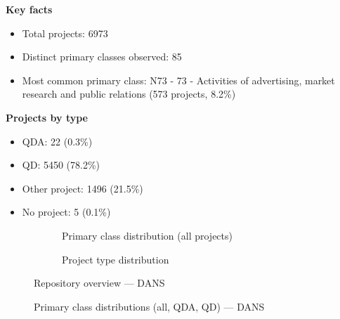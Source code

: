 \textbf{Key facts}

\begin{itemize}
    \item Total projects: 6973
    \item Distinct primary classes observed: 85
    \item Most common primary class: N73 - 73 - Activities of advertising, market research and public relations (573 projects, 8.2\%)
\end{itemize}

\textbf{Projects by type}

\begin{itemize}
    \item QDA: 22 (0.3\%)
    \item QD: 5450 (78.2\%)
    \item Other project: 1496 (21.5\%)
    \item No project: 5 (0.1\%)
\end{itemize}

\begin{figure}[H]
    \centering
    \begin{subfigure}[t]{0.49\textwidth}
        \centering
        
        \caption{Primary class distribution (all projects)}
    \end{subfigure}
    \hfill
    \begin{subfigure}[t]{0.49\textwidth}
        \centering
        
        \caption{Project type distribution}
    \end{subfigure}
    \caption{Repository overview --- DANS}
\end{figure}

\clearpage

\begin{figure}[H]
    \centering
    
    \par\vspace{0.8em}
    
    \par\vspace{0.8em}
    
    \caption{Primary class distributions (all, QDA, QD) --- DANS}
\end{figure}

